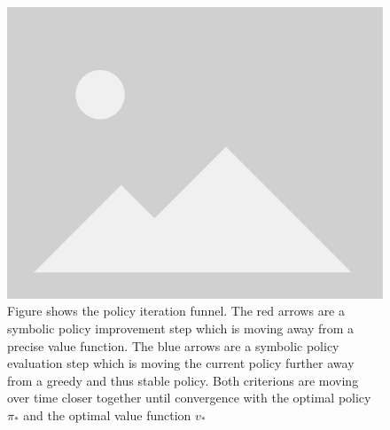 \begin{figure}
    \begin{center}
        \includegraphics[width=0.5\linewidth]{figures/place_holder.png}
        \caption[policy iteration funnel]{Figure shows the policy iteration funnel. The red arrows are a symbolic policy improvement step which is moving away from a precise value function. The blue arrows are a symbolic policy evaluation step which is moving the current policy further away from a greedy and thus stable policy. Both criterions are moving over time closer together until convergence with the optimal policy $\pi_*$ and the optimal value function $v_*$}
        \label{fig:policy-iteration-concept-funnel}
    \end{center}
\end{figure}